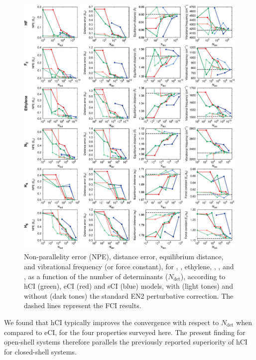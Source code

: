 \documentclass[aip,jcp,reprint,noshowkeys,superscriptaddress]{revtex4-1}
\newcommand{\Ndet}{N_\text{det}}
\begin{document}
\begin{figure}%
\includegraphics[width=1.0\linewidth]{plot_all_closed}
\caption{
Non-parallelity error (NPE), distance error, equilibrium distance, and vibrational frequency (or force constant), for , , ethylene, , , and ,
as a function of the number of determinants ($\Ndet$), according to hCI (green), eCI (red) and sCI (blue) models,
with (light tones) and without (dark tones) the standard EN2 perturbative correction.
The dashed lines represent the FCI results.}
\label{fig:plot_all_closed}
\end{figure}

We found that hCI typically improves the convergence with respect to $\Ndet$ when compared to eCI, for the four properties surveyed here.
The present finding for open-shell systems therefore parallels the previously reported superiority of hCI for closed-shell systems. \cite{Kossoski_2022}
\end{document}
